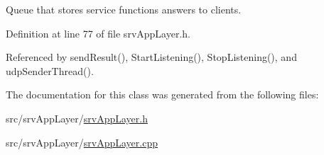 Queue that stores service functions answers to clients. 



Definition at line 77 of file srvAppLayer.h.



Referenced by sendResult(), StartListening(), StopListening(), and udpSenderThread().



The documentation for this class was generated from the following files:\begin{DoxyCompactItemize}
\item 
src/srvAppLayer/\hyperlink{srvAppLayer_8h}{srvAppLayer.h}\item 
src/srvAppLayer/\hyperlink{srvAppLayer_8cpp}{srvAppLayer.cpp}\end{DoxyCompactItemize}
